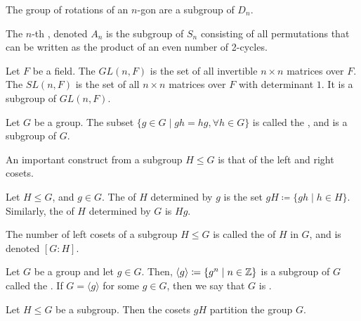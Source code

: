 \begin{example}
  The group of rotations of an \(n\)-gon are a subgroup of \(D_{n}\).
\end{example}


\begin{example}\label{ex:group-theory:alternating-group}
  The \(n\)-th , denoted \(A_{n}\) is the subgroup of \(S_{n}\) consisting of all permutations that can be written as the product of an even number of 2-cycles.
\end{example}

\begin{example}
  Let \(F\) be a field.
  The  \(GL(n, F)\) is the set of all invertible \(n \times n\) matrices over \(F\).
  The  \(SL(n, F)\) is the set of all \(n \times n\) matrices over \(F\) with determinant \(1\).
  It is a subgroup of \(GL(n, F)\).
\end{example}

\begin{example}\label{ex:group-theory:centre-subgroup}
  Let \(G\) be a group. The subset \(\{ g \in G \mid gh = hg, \forall h \in G\}\) is called the , and is a subgroup of \(G\).
\end{example}


An important construct from a subgroup \(H \leq G\) is that of the left and right cosets.

\begin{definition}\label{def:group-theory:coset}
  Let \(H \leq G\), and \(g \in G\).
  The  of \(H\) determined by \(g\) is the set \(gH \coloneqq \{gh \mid h \in H\}\).
  Similarly, the  of \(H\) determined by \(G\) is \(Hg\).


  The number of left cosets of a subgroup \(H \leq G\) is called the  of \(H\) in \(G\), and is denoted \([G : H]\).
\end{definition}

\begin{example}
  Let \(G\) be a group and let \(g \in G\).
  Then, \(\langle g \rangle \coloneqq \{g^{n} \mid n \in \mathbb{Z}\}\) is a subgroup of \(G\) called the .
  If \(G = \langle g \rangle\) for some \(g \in G\), then we say that \(G\) is .
\end{example}

\begin{lemma}
  \label{lem:group-theory:cosets-partition-a-group}
  Let \(H \leq G\) be a subgroup. Then the cosets \(gH\) partition the group \(G\).
\end{lemma}

